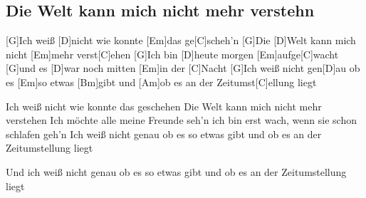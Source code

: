\subsection*{Die Welt kann mich nicht mehr verstehn   }



\begin{guitar}


[G]Ich weiß [D]nicht wie konnte [Em]das ge[C]scheh'n
[G]Die [D]Welt kann mich nicht [Em]mehr verst[C]ehen
[G]Ich bin [D]heute morgen [Em]aufge[C]wacht
[G]und es [D]war noch mitten [Em]in der [C]Nacht
[G]Ich weiß nicht gen[D]au ob es [Em]so etwas [Bm]gibt
und [Am]ob es an der Zeitumst[C]ellung liegt


Ich weiß nicht wie konnte das geschehen
Die Welt kann mich nicht mehr verstehen
Ich möchte alle meine Freunde seh'n
ich bin erst wach, wenn sie schon schlafen geh'n
Ich weiß nicht genau ob es so etwas gibt
und ob es an der Zeitumstellung liegt

Und ich weiß nicht genau ob es so etwas gibt
und ob es an der Zeitumstellung liegt 
\end{guitar}
